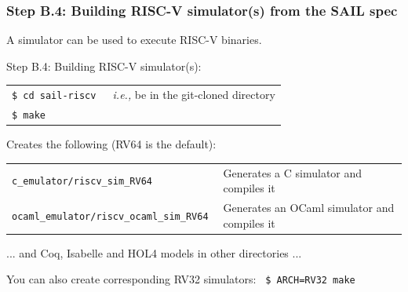 \documentclass[aspectratio=169]{beamer}
\newcommand{\hm}{\hspace*{1em}}
\newcommand{\hmmm}{\hspace*{3em}}
\newcommand{\scripttt}{\scriptsize\tt}
\begin{document}
\begin{frame}
  \frametitle{Step B.4: Building RISC-V simulator(s) from the SAIL spec}

  A simulator can be used to execute RISC-V binaries.

  \begin{block}{Step B.4: Building RISC-V simulator(s):}
    \scriptsize
    \begin{tabular}{ll}
      \tt \$ cd sail-riscv \hmmm & \emph{i.e.,} be in the git-cloned directory \\
      \tt \$ make
    \end{tabular}
  \end{block}

  \begin{block}{Creates the following (RV64 is the default):}
    \scriptsize
    \begin{tabular}{ll}
      \tt c\_emulator/riscv\_sim\_RV64            & Generates a C simulator and compiles it \\
      \tt ocaml\_emulator/riscv\_ocaml\_sim\_RV64 & Generates an OCaml simulator and compiles it \\
    \end{tabular}

    ... and Coq, Isabelle and HOL4 models in other directories ...
  \end{block}

  \begin{block}{You can also create corresponding RV32 simulators:}
    {\scripttt
      \hm{}\$ ARCH=RV32 make}
  \end{block}

\end{frame}

\end{document}
